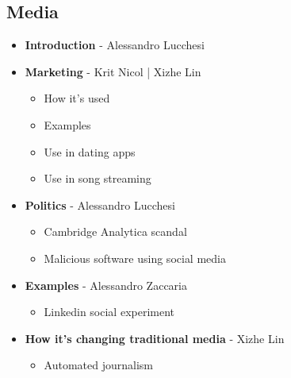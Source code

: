 \documentclass[12pt]{article}
\begin{document}
\subsection{Media} 
\begin{itemize}[label=$\bullet$]
    \item \textbf{Introduction} - Alessandro Lucchesi
    \item \textbf{Marketing} - Krit Nicol | Xizhe Lin
    \begin{itemize}[label=$\circ$]
        \item How it's used
        \item Examples
        \item Use in dating apps
        \item Use in song streaming
     \end{itemize}
    \item \textbf{Politics} - Alessandro Lucchesi 
    \begin{itemize}[label=$\circ$]
         \item Cambridge Analytica scandal
         \item Malicious software using social media
     \end{itemize}
     \item \textbf{Examples} - Alessandro Zaccaria
    \begin{itemize}[label=$\circ$]
         \item Linkedin social experiment 
     \end{itemize}
          \item \textbf{How it's changing traditional media} - Xizhe Lin
    \begin{itemize}[label=$\circ$]
         \item Automated journalism
     \end{itemize}
\end{itemize}

\newpage
\end{document}
